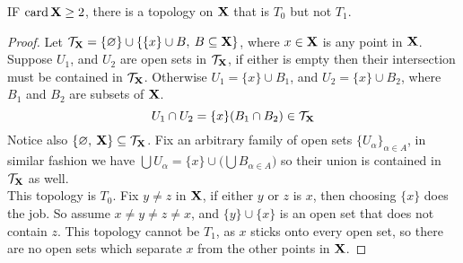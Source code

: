 \documentclass[../../main.tex]{subfiles}
\begin{document}
\fexercisesHeader

\begin{wts}
    IF $\operatorname{card}{{\mathbf{X}}}\geq 2$, there is a topology on ${\mathbf{X}}$ that is $T_0$ but not $T_1$.
\end{wts}
\begin{proof}
    Let $\mathcal{T}_{\mathbf{X}} = \{\varnothing\}\cup\{\{x\}\cup B,\: B\subseteq {\mathbf{X}}\}$, where $x\in{\mathbf{X}}$ is any point in ${\mathbf{X}}$. Suppose $U_1$, and $U_2$ are open sets in $\mathcal{T}_{\mathbf{X}}$, if either is empty then their intersection must be contained in $\mathcal{T}_{\mathbf{X}}$. Otherwise $U_1 = \{x\}\cup B_1$, and $U_2 = \{x\}\cup B_2$, where $B_1$ and $B_2$ are subsets of ${\mathbf{X}}$.
    \[
        U_1\cap U_2 = \{x\}(B_1\cap B_2)\in \mathcal{T}_{\mathbf{X}}
    \]
    Notice also $\{\varnothing,\: {\mathbf{X}}\}\subseteq\mathcal{T}_{\mathbf{X}}$. Fix an arbitrary family of open sets $\{U_\alpha\}_{\alpha\in A}$, in similar fashion we have $\bigcup U_\alpha = \{x\}\cup\biggl( \bigcup B_{\alpha\in A} \biggr)$ so their union is contained in $\mathcal{T}_{\mathbf{X}}$ as well.\\

    This topology is $T_0$. Fix $y\neq z$ in ${\mathbf{X}}$, if either $y$ or $z$ is $x$, then choosing $\{x\}$ does the job. So assume $x\neq y\neq z\neq x$, and $\{y\}\cup \{x\}$ is an open set that does not contain $z$. This topology cannot be $T_1$, as $x$ sticks onto every open set, so there are no open sets which separate $x$ from the other points in ${\mathbf{X}}$.
\end{proof}
\newpage
\end{document}
